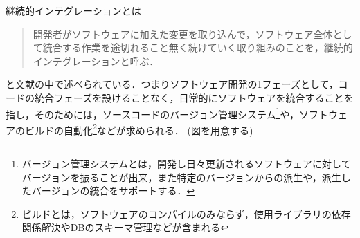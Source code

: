 継続的インテグレーションとは

\begin{quote}

  開発者がソフトウェアに加えた変更を取り込んで，ソフトウェア全体として統合する作業を途切れること無く続けていく取り組みのことを，継続的インテグレーションと呼ぶ．

\end{quote}

と文献\cite{西村直人2011アジャイルサムライ}の中で述べられている．つまりソフトウェア開発の1フェーズとして，コードの統合フェーズを設けることなく，日常的にソフトウェアを統合することを指し，そのためには，ソースコードのバージョン管理システム\footnote{バージョン管理システムとは，開発し日々更新されるソフトウェアに対してバージョンを振ることが出来，また特定のバージョンからの派生や，派生したバージョンの統合をサポートする．}や，ソフトウェアのビルドの自動化\footnote{ビルドとは，ソフトウェアのコンパイルのみならず，使用ライブラリの依存関係解決やDBのスキーマ管理などが含まれる}などが求められる． (図を用意する)
